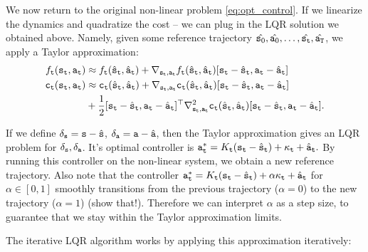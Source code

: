 We now return to the original non-linear problem \ref{eq:opt_control}. If we linearize the dynamics and quadratize the cost -- we can plug in the LQR solution we obtained above. Namely, given some reference trajectory $\hat{{\tt s}_0},\hat{{\tt a}_0},\dots,\hat{{\tt s}_{\tt t}}, \hat{{\tt a}_{\tt T}}$, we apply a Taylor approximation:
\begin{equation}\label{eq:Taylor_approx}
\begin{split}
    {f_{\tt t}}({{\tt s}_{\tt t}},{{\tt a}_{\tt t}}) &\approx {f_{\tt t}}({\hat{{\tt s}}_{\tt t}},{\hat{{\tt a}}_{\tt t}}) + \nabla_{{\tt s}_{\tt t}, {\tt a}_{\tt t}}f_{\tt t}({\hat{{\tt s}}_{\tt t}},{\hat{{\tt a}}_{\tt t}}) [{\tt s}_{\tt t} - \hat{{\tt s}}_{\tt t}, {\tt a}_{\tt t} - \hat{{\tt a}}_{\tt t}] \\
    {{\tt c}_{\tt t}}({{\tt s}_{\tt t}},{{\tt a}_{\tt t}}) &\approx {{\tt c}_{\tt t}}({\hat{{\tt s}}_{\tt t}},{\hat{{\tt a}}_{\tt t}}) + \nabla_{{\tt s}_{\tt t}, {\tt a}_{\tt t}}{\tt c}_{\tt t}({\hat{{\tt s}}_{\tt t}},{\hat{{\tt a}}_{\tt t}}) [{\tt s}_{\tt t} - \hat{{\tt s}}_{\tt t}, {\tt a}_{\tt t} - \hat{{\tt a}}_{\tt t}] \\
    & + \frac{1}{2} [{\tt s}_{\tt t} - \hat{{\tt s}}_{\tt t}, {\tt a}_{\tt t} - \hat{{\tt a}}_{\tt t}]^\top \nabla^2_{{\tt s}_{\tt t}, {\tt a}_{\tt t}}{\tt c}_{\tt t}({\hat{{\tt s}}_{\tt t}},{\hat{{\tt a}}_{\tt t}}) [{\tt s}_{\tt t} - \hat{{\tt s}}_{\tt t}, {\tt a}_{\tt t} - \hat{{\tt a}}_{\tt t}].
\end{split}
\end{equation}

If we define $\delta_{\tt s} = {\tt s} - \hat{{\tt s}}$, $\delta_{\tt a} = {\tt a} - \hat{{\tt a}}$, then the Taylor approximation gives an LQR problem for $\delta_{\tt s}, \delta_{\tt a}$. It's optimal controller is ${\tt a}_{\tt t}^* = K_{\tt t} ({\tt s}_{\tt t} - \hat{{\tt s}}_{\tt t}) + \kappa_{\tt t} + \hat{{\tt a}}_{\tt t}.$ By running this controller on the non-linear system, we obtain a new reference trajectory. 
Also note that the controller ${\tt a}_{\tt t}^* = K_{\tt t} ({\tt s}_{\tt t} - \hat{{\tt s}}_{\tt t}) + \alpha \kappa_{\tt t} + \hat{{\tt a}}_{\tt t}$ for $\alpha \in [0,1]$ smoothly transitions from the previous trajectory ($\alpha=0$) to the new trajectory ($\alpha=1$) (show that!). Therefore we can interpret $\alpha$ as a step size, to guarantee that we stay within the Taylor approximation limits.

The iterative LQR algorithm works by applying this approximation iteratively:


